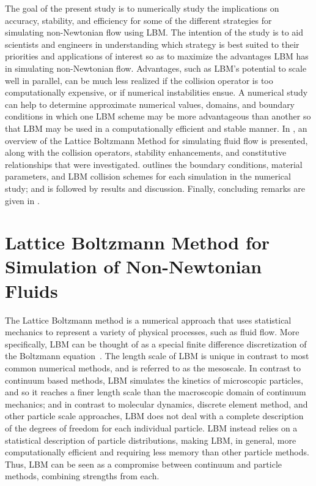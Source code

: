 The goal of the present study is to numerically study the implications on accuracy, stability, and efficiency for some of the different strategies for simulating non-Newtonian flow using LBM. The intention of the study is to aid scientists and engineers in understanding which strategy is best suited to their priorities and applications of interest so as to maximize the advantages LBM has in simulating non-Newtonian flow.
Advantages, such as LBM's potential to scale well in parallel, can be much less realized if the collision operator is too computationally expensive, or if numerical instabilities ensue.
A numerical study can help to determine approximate numerical values, domains, and boundary conditions in which one LBM scheme may be more advantageous than another so that LBM may be used in a computationally efficient and stable manner.
In , an overview of the Lattice Boltzmann Method for simulating fluid flow is presented, along with the collision operators, stability enhancements, and constitutive relationships that were investigated.
 outlines the boundary conditions, material parameters, and LBM collision schemes for each simulation in the numerical study; and is followed by results and discussion.
Finally, concluding remarks are given in .


\section{Lattice Boltzmann Method for Simulation of Non-Newtonian Fluids} \label{sec:LBM}

The Lattice Boltzmann method is a numerical approach that uses statistical mechanics to represent a variety of physical processes, such as fluid flow.
More specifically, LBM can be thought of as a special finite difference discretization of the Boltzmann equation~\cite{chen1998lattice}.
The length scale of LBM is unique in contrast to most common numerical methods, and is referred to as the mesoscale.
In contrast to continuum based methods, LBM simulates the kinetics of microscopic particles, and so it reaches a finer length scale than the macroscopic domain of continuum mechanics; and in contrast to molecular dynamics, discrete element method, and other particle scale approaches, LBM does not deal with a complete description of the degrees of freedom for each individual particle.
LBM instead relies on a statistical description of particle distributions, making LBM, in general, more computationally efficient and requiring less memory than other particle methods.
Thus, LBM can be seen as a compromise between continuum and particle methods, combining strengths from each.

